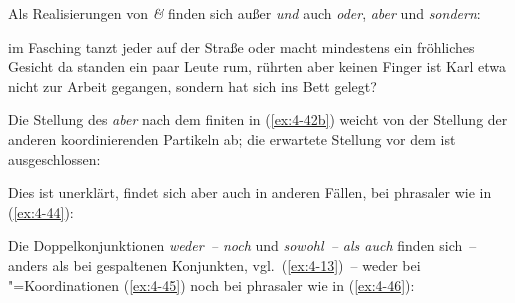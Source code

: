 \documentclass[output=paper]{langsci/langscibook}
\begin{document}
\ssubsection{}%
\label{subsec:4-3-2}
Als Realisierungen von \textit{\&} finden sich außer \textit{und} auch \textit{oder}, \textit{aber} und \textit{sondern}:

\begin{exe}
\ex
\label{ex:4-42}
\begin{xlist}
\ex%
\label{ex:4-42a}
im Fasching tanzt jeder auf der Straße oder macht mindestens ein fröhliches Gesicht
\ex%
\label{ex:4-42b}
da standen ein paar Leute rum, rührten aber keinen Finger
\ex%
\label{ex:4-42c}
ist Karl etwa nicht zur Arbeit gegangen, sondern hat sich ins Bett gelegt?
\end{xlist}
\end{exe}
Die Stellung des \textit{aber} nach dem finiten  in (\ref{ex:4-42b}) weicht von der Stellung der anderen koordinierenden Partikeln ab; die erwartete Stellung vor dem  ist ausgeschlossen:

\begin{exe}
\end{exe}
Dies ist unerklärt, findet sich aber auch in anderen Fällen, \zb bei phrasaler  wie in (\ref{ex:4-44}):

\begin{exe}
\ex
\label{ex:4-44}
\begin{xlist}

\end{xlist}
\end{exe}
Die Doppelkonjunktionen \textit{weder~-- noch} und \textit{sowohl~-- als auch} finden sich~-- anders als bei gespaltenen Konjunkten, vgl.\ (\ref{ex:4-13})~-- weder bei "=Koordinationen (\ref{ex:4-45}) noch bei phrasaler  wie in (\ref{ex:4-46}):

\end{document}
